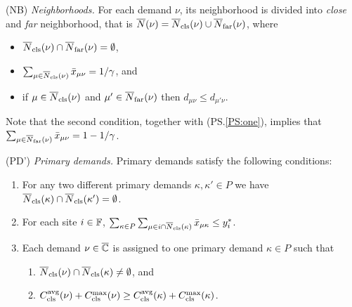 \begin{description}
	
      \renewcommand{\theenumii}{(\alph{enumii})}
      \renewcommand{\labelenumii}{\theenumii}

\item{(NB)} \label{NB}
	\emph{Neighborhoods.}
	For each demand $\nu$, its neighborhood is divided into \emph{close} and
	\emph{far} neighborhood, that is ${\overline{N}}(\nu) = {\overline{N}}_{\text{cls}}(\nu) \cup {\overline{N}}_{\text{far}}(\nu)$, where
	\begin{itemize}
	\item ${\overline{N}}_{\text{cls}}(\nu) \cap {\overline{N}}_{\text{far}}(\nu) = \emptyset$,
	\item $\sum_{\mu\in{\overline{N}}_{\text{cls}}(\nu)} {\bar x}_{\mu\nu} =1/\gamma$, and 
	\item if $\mu\in {\overline{N}}_{\text{cls}}(\nu)$ and $\mu'\in {\overline{N}}_{\text{far}}(\nu)$ 
				then $d_{\mu\nu}\le d_{\mu'\nu}$.   
	\end{itemize}
	Note that the second condition, together with (PS.\ref{PS:one}), implies
	that $\sum_{\mu\in{\overline{N}}_{\text{far}}(\nu)} {\bar x}_{\mu\nu} =1-1/\gamma$.

\item{(PD')} \emph{Primary demands.}
	Primary demands satisfy the following conditions:

	\begin{enumerate}
		
	\item\label{PD1:disjoint}  For any two different primary demands $\kappa,\kappa'\in P$ we have
				${\overline{N}}_{\text{cls}}(\kappa)\cap {\overline{N}}_{\text{cls}}(\kappa') = \emptyset$.

	\item \label{PD1:yi} For each site $i\in\mathbb{F}$, 
		$ \sum_{\kappa\in P}\sum_{\mu\in i\cap{\overline{N}}_{\text{cls}}(\kappa)}{\bar x}_{\mu\kappa} \leq y_i^\ast$.
		
	\item \label{PD1:assign} Each demand $\nu\in\overline{\mathbb{C}}$ is assigned
        to one primary demand $\kappa\in P$ such that

  			\begin{enumerate}
	
				\item \label{PD1:assign:overlap} ${\overline{N}}_{\text{cls}}(\nu) \cap {\overline{N}}_{\text{cls}}(\kappa) \neq \emptyset$, and
				\item \label{PD1:assign:cost}
          $C_{\text{cls}}^{{\mbox{\scriptsize\rm avg}}}(\nu)+C_{\text{cls}}^{\max}(\nu) \geq
          C_{\text{cls}}^{{\mbox{\scriptsize\rm avg}}}(\kappa)+C_{\text{cls}}^{\max}(\kappa)$.
			\end{enumerate}


\end{enumerate}
\end{description}
